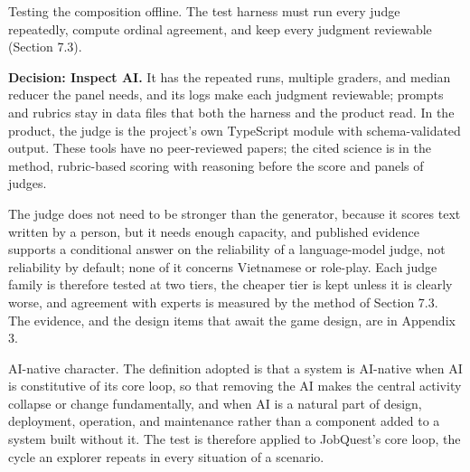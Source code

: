 Testing the composition offline. The test harness must run every judge repeatedly, compute ordinal agreement, and keep every judgment reviewable (Section 7.3).

\textbf{Decision: Inspect AI.} It has the repeated runs, multiple graders, and median reducer the panel needs, and its logs make each judgment reviewable; prompts and rubrics stay in data files that both the harness and the product read. In the product, the judge is the project's own TypeScript module with schema-\allowbreak{}validated output. These tools have no peer-\allowbreak{}reviewed papers; the cited science is in the method, rubric-\allowbreak{}based scoring with reasoning before the score\cite{r58} and panels of judges\cite{r74}.

The judge does not need to be stronger than the generator, because it scores text written by a person, but it needs enough capacity, and published evidence supports a conditional answer on the reliability of a language-\allowbreak{}model judge, not reliability by default; none of it concerns Vietnamese or role-play. Each judge family is therefore tested at two tiers, the cheaper tier is kept unless it is clearly worse, and agreement with experts is measured by the method of Section 7.3. The evidence, and the design items that await the game design, are in Appendix 3.

AI-native character. The definition adopted is that a system is AI-native when AI is constitutive of its core loop, so that removing the AI makes the central activity collapse or change fundamentally\cite{r130}, and when AI is a natural part of design, deployment, operation, and maintenance rather than a component added to a system built without it\cite{r131}. The test is therefore applied to JobQuest's core loop, the cycle an explorer repeats in every situation of a scenario.

